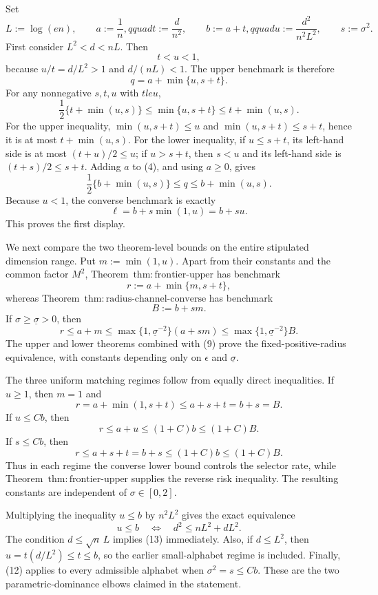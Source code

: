 Set
\[
 L:=\log(en),\qquad a:=\frac1n,qquad t:=\frac d{n^2},
 \qquad b:=a+t,qquad u:=\frac{d^2}{n^2L^2},
 \qquad s:=\sigma^2.
\tag{1}
\]
First consider \(L^2<d<nL\).  Then
\[
 t<u<1,
\tag{2}
\]
because \(u/t=d/L^2>1\) and \(d/(nL)<1\).  The upper benchmark is therefore
\[
 q=a+\min\{u,s+t\}.
\tag{3}
\]
For any nonnegative \(s,t,u\) with \(tle u\),
\[
 \frac12\{t+\min(u,s)\}
 \le \min\{u,s+t\}
 \le t+\min(u,s).
\tag{4}
\]
For the upper inequality, \(\min(u,s+t)\le u\) and \(\min(u,s+t)\le s+t\), hence it is at most \(t+\min(u,s)\).  For the lower inequality, if \(u\le s+t\), its left-hand side is at most \((t+u)/2\le u\); if \(u>s+t\), then \(s<u\) and its left-hand side is \((t+s)/2\le s+t\).  Adding \(a\) to (4), and using \(a\ge0\), gives
\[
 \frac12\{b+\min(u,s)\}
 \le q\le b+\min(u,s).
\tag{5}
\]
Because \(u<1\), the converse benchmark is exactly
\[
 \ell=b+s\min(1,u)=b+su.
\tag{6}
\]
This proves the first display.

We next compare the two theorem-level bounds on the entire stipulated dimension range.  Put \(m:=\min(1,u)\).  Apart from their constants and the common factor \(M^2\), Theorem~\(\mathrm{thm:frontier\text{-}upper}\) has benchmark
\[
 r:=a+\min\{m,s+t\},
\tag{7}
\]
whereas Theorem~\(\mathrm{thm:radius\text{-}channel\text{-}converse}\) has benchmark
\[
 B:=b+sm.
\tag{8}
\]
If \(\sigma\ge\underline\sigma>0\), then
\[
 r\le a+m
 \le \max\{1,\underline\sigma^{-2}\}(a+sm)
 \le \max\{1,\underline\sigma^{-2}\}B.
\tag{9}
\]
The upper and lower theorems combined with (9) prove the fixed-positive-radius equivalence, with constants depending only on \(\epsilon\) and \(\underline\sigma\).

The three uniform matching regimes follow from equally direct inequalities.  If \(u\ge1\), then \(m=1\) and
\[
 r=a+\min(1,s+t)\le a+s+t=b+s=B.
\tag{10}
\]
If \(u\le Cb\), then
\[
 r\le a+u\le(1+C)b\le(1+C)B.
\tag{11}
\]
If \(s\le Cb\), then
\[
 r\le a+s+t=b+s\le(1+C)b\le(1+C)B.
\tag{12}
\]
Thus in each regime the converse lower bound controls the selector rate, while Theorem~\(\mathrm{thm:frontier\text{-}upper}\) supplies the reverse risk inequality.  The resulting constants are independent of \(\sigma\in[0,2]\).

Multiplying the inequality \(u\le b\) by \(n^2L^2\) gives the exact equivalence
\[
 u\le b
 \quad\Longleftrightarrow\quad
 d^2\le nL^2+dL^2.
\tag{13}
\]
The condition \(d\le\sqrt n\,L\) implies (13) immediately.  Also, if \(d\le L^2\), then \(u=t(d/L^2)\le t\le b\), so the earlier small-alphabet regime is included.  Finally, (12) applies to every admissible alphabet when \(\sigma^2=s\le Cb\).  These are the two parametric-dominance elbows claimed in the statement.

